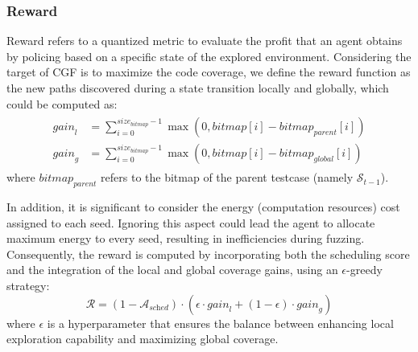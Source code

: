 \documentclass[lettersize,journal]{IEEEtran}
\begin{document}
\subsubsection{Reward}\label{subsubsec:reward}
Reward refers to a quantized metric to evaluate the profit that an agent obtains by policing based on a specific state of the explored environment. Considering the target of CGF is to maximize the code coverage, we define the reward function as the new paths discovered during a state transition locally and globally, which could be computed as: 
\begin{align}
	\begin{split}
		\textit{gain}_{l} &= \sum_{i=0}^{\textit{size}_{\textit{bitmap}} - 1} \max(0, \textit{bitmap}[i] - \textit{bitmap}_{\textit{parent}}[i]) \\
		\textit{gain}_{g} &= \sum_{i=0}^{\textit{size}_{\textit{bitmap}} - 1} \max(0, \textit{bitmap}[i] - \textit{bitmap}_{\textit{global}}[i])
	\end{split}
\end{align}
where $\textit{bitmap}_{\textit{parent}}$ refers to the bitmap of the parent testcase (namely $\mathcal{S}_{t-1}$).

In addition, it is significant to consider the energy (computation resources) cost assigned to each seed. Ignoring this aspect could lead the agent to allocate maximum energy to every seed, resulting in inefficiencies during fuzzing. Consequently, the reward is computed by incorporating both the scheduling score and the integration of the local and global coverage gains, using an $\epsilon$-greedy strategy:
\begin{equation}
	\mathcal{R} = (1 - \mathcal{A}_{\textit{sched}}) \cdot \left(\epsilon \cdot \textit{gain}_{l} + (1 - \epsilon) \cdot \textit{gain}_{g}\right)
	\label{eq:reward}
\end{equation}
where $\epsilon$ is a hyperparameter that ensures the balance between enhancing local exploration capability and maximizing global coverage.
\end{document}

